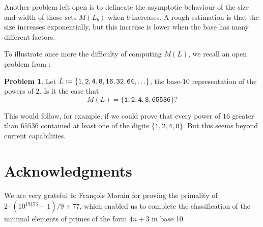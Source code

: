 \documentclass[12pt]{article}
\theoremstyle{plain}
\theoremstyle{definition}
\newtheorem{problem}[theorem]{Problem}
\newcommand{\0}{\mathtt{0}}
\newcommand{\1}{\mathtt{1}}
\newcommand{\2}{\mathtt{2}}
\newcommand{\3}{\mathtt{3}}
\newcommand{\4}{\mathtt{4}}
\newcommand{\5}{\mathtt{5}}
\newcommand{\6}{\mathtt{6}}
\newcommand{\7}{\mathtt{7}}
\newcommand{\8}{\mathtt{8}}
\newcommand{\9}{\mathtt{9}}
\begin{document}
Another problem left open is to delineate the asymptotic behaviour of the size and width of those sets $M(L_b)$ when $b$ increases.
A rough estimation is that the size increases exponentially, but this increase is lower when the base has many different factors.

To illustrate once more the difficulty of computing $M(L)$, we recall
an open problem from \cite{Sh00}:

\begin{problem} 
Let $L \coloneqq \lbrace {\tt 1, 2, 4, 8, 16, 32, 64, } \ldots \rbrace$, the
base-$10$ representation of the powers of $2$.  
Is it the case that
$$ M(L) = \lbrace \1, \2, \4, \8, \6\5\5\3\6 \rbrace ? $$
\end{problem}

This would follow, for example, if we could prove that every power
of $16$ greater than $65536$ contained at least one of the digits
$\lbrace \1, \2, \4, \8 \rbrace$.  But this seems beyond current capabilities.

\section*{Acknowledgments}

We are very grateful to
Fran\c{c}ois Morain for proving the primality of 
$2 \cdot (10^{19153} - 1)/9 + 77$, which enabled us to complete the
classification of the minimal elements of primes of the form $4n+3$
in base 10.
\end{document}
